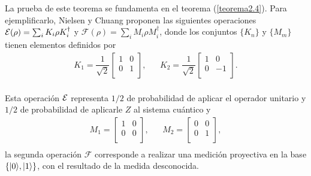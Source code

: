 La prueba de este teorema se fundamenta en el teorema ({\ref{teorema2.4}}). Para ejemplificarlo, Nielsen y Chuang {\cite{nielsen_chuang_2010}} proponen las siguientes operaciones $\mathcal{E}(\rho)=\sum_i K_i\rho K_i^\dagger$ y $\mathcal{F}(\rho)=\sum_i M_i\rho M_i^\dagger$, donde los conjuntos $\{K_n\}$ y $\{M_m\}$ tienen elementos definidos por 
\begin{equation}
    \begin{array}{ccc}
        K_1=\dfrac{1}{\sqrt{2}}\begin{bmatrix}
            1&0\\
            0&1\\
        \end{bmatrix},&&K_2=\dfrac{1}{\sqrt{2}}\begin{bmatrix}
            1&0\\
            0&-1\\
        \end{bmatrix}.\\
    \end{array}
\end{equation}

Esta operación $\mathcal{E}$ representa $1/2$ de probabilidad de aplicar el operador unitario y $1/2$ de probabilidad de aplicarle $Z$ al sistema cuántico y
\begin{equation}
    \begin{array}{ccc}
        M_1=\begin{bmatrix}
            1&0\\
            0&0\\
        \end{bmatrix},&&M_2=\begin{bmatrix}
            0&0\\
            0&1\\
        \end{bmatrix},\\
    \end{array}
\end{equation}
la segunda operación $\mathcal{F}$ corresponde a realizar una medición
proyectiva en la base $\{|0\rangle , |1\rangle\}$, con el resultado de la medida
desconocida. 




